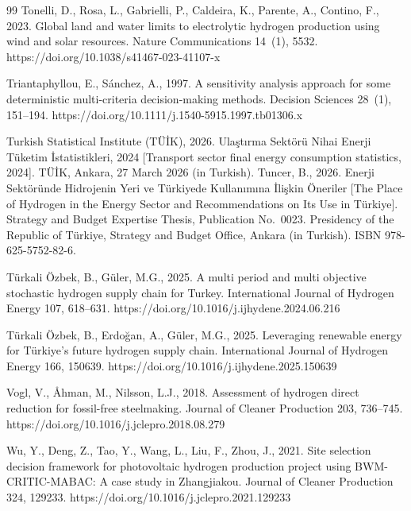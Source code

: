 \documentclass[preprint,12pt,authoryear]{elsarticle}
\begin{document}
\begin{thebibliography}{99}
Tonelli, D., Rosa, L., Gabrielli, P., Caldeira, K., Parente, A., Contino, F., 2023. Global land and water limits to electrolytic hydrogen production using wind and solar resources. Nature Communications 14~(1), 5532. https://doi.org/10.1038/s41467-023-41107-x

Triantaphyllou, E., S{\'a}nchez, A., 1997. A sensitivity analysis approach for some deterministic multi-criteria decision-making methods. Decision Sciences 28~(1), 151--194. https://doi.org/10.1111/j.1540-5915.1997.tb01306.x

Turkish Statistical Institute (T{\"U}{\.I}K), 2026. Ula{\c{s}}t{\i}rma Sekt{\"o}r{\"u} Nihai Enerji T{\"u}ketim {\.I}statistikleri, 2024 [Transport sector final energy consumption statistics, 2024]. T{\"U}{\.I}K, Ankara, 27 March 2026 (in Turkish).
Tuncer, B., 2026. Enerji Sekt{\"o}r{\"u}nde Hidrojenin Yeri ve T{\"u}rkiye{\textquotesingle}de Kullan{\i}m{\i}na {\.I}li{\c{s}}kin {\"O}neriler [The Place of Hydrogen in the Energy Sector and Recommendations on Its Use in T{\"u}rkiye]. Strategy and Budget Expertise Thesis, Publication No.~0023. Presidency of the Republic of T{\"u}rkiye, Strategy and Budget Office, Ankara (in Turkish). ISBN 978-625-5752-82-6.

T{\"u}rkali {\"O}zbek, B., G{\"u}ler, M.G., 2025. A multi period and multi objective stochastic hydrogen supply chain for Turkey. International Journal of Hydrogen Energy 107, 618--631. https://doi.org/10.1016/j.ijhydene.2024.06.216

T{\"u}rkali {\"O}zbek, B., Erdo{\u{g}}an, A., G{\"u}ler, M.G., 2025. Leveraging renewable energy for T{\"u}rkiye's future hydrogen supply chain. International Journal of Hydrogen Energy 166, 150639. https://doi.org/10.1016/j.ijhydene.2025.150639


Vogl, V., {\AA}hman, M., Nilsson, L.J., 2018. Assessment of hydrogen direct reduction for fossil-free steelmaking. Journal of Cleaner Production 203, 736--745. https://doi.org/10.1016/j.jclepro.2018.08.279

Wu, Y., Deng, Z., Tao, Y., Wang, L., Liu, F., Zhou, J., 2021. Site selection decision framework for photovoltaic hydrogen production project using BWM-CRITIC-MABAC: A case study in Zhangjiakou. Journal of Cleaner Production 324, 129233. https://doi.org/10.1016/j.jclepro.2021.129233


\end{thebibliography}
\end{document}
